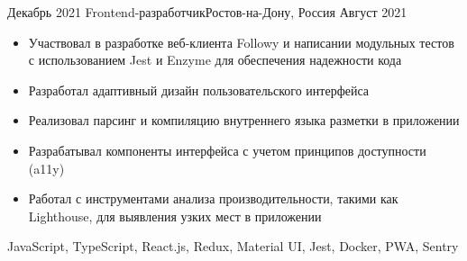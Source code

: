 
\begin{experiences}
  \experience
    {Декабрь 2021} {Frontend-разработчик}{}{Ростов-на-Дону, Россия}
    {Август 2021}  {
                     \begin{itemize}
                     \item Участвовал в разработке веб-клиента Followy и написании модульных тестов с \mbox{использованием} Jest и Enzyme для обеспечения надежности кода
                     \item Разработал адаптивный дизайн пользовательского интерфейса
                     \item Реализовал парсинг и компиляцию внутреннего языка разметки в приложении
                     \item Разрабатывал компоненты интерфейса с учетом принципов доступности (a11y)
                     \item Работал с инструментами анализа производительности, такими как Lighthouse, для выявления узких мест в приложении
                     \end{itemize}
                  }
                  {JavaScript, TypeScript, React.js, Redux, Material UI, Jest, Docker, PWA, Sentry}
\end{experiences}
